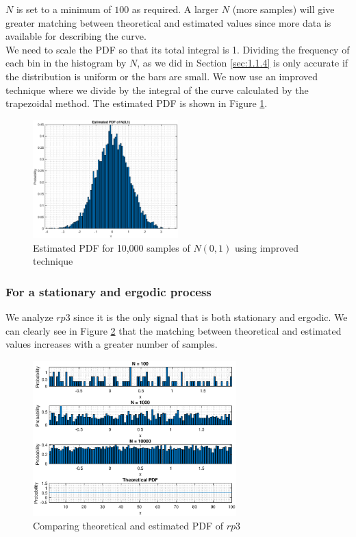 \documentclass{article}
\begin{document}
\vspace{0.4cm}

$N$ is set to a minimum of $100$ as required. A larger $N$ (more samples) will give greater matching between theoretical and estimated values since more data is available for describing the curve.\\

We need to scale the PDF so that its total integral is 1. Dividing the frequency of each bin in the histogram by $N$, as we did in Section \ref{sec:1.1.4} is only accurate if the distribution is uniform or the bars are small. We now use an improved technique where we divide by the integral of the curve calculated by the trapezoidal method. The estimated PDF is shown in Figure \ref{fig:pdf}.

\begin{figure}[h!]
\centering
\includegraphics[width=0.5\textwidth]{pdf}
\caption{\label{fig:pdf} Estimated PDF for 10,000 samples of $N(0,1)$ using improved technique}
\end{figure}


\pagebreak


\subsubsection{For a stationary and ergodic process}

We analyze $rp3$ since it is the only signal that is both stationary and ergodic. We can clearly see in Figure \ref{fig:pdf_stat} that the matching between theoretical and estimated values increases with a greater number of samples.

\begin{figure}[h!]
\centering
\includegraphics[width=0.7\textwidth]{pdf_stat}
\caption{\label{fig:pdf_stat} Comparing theoretical and estimated PDF of $rp3$}
\end{figure}
\end{document}
